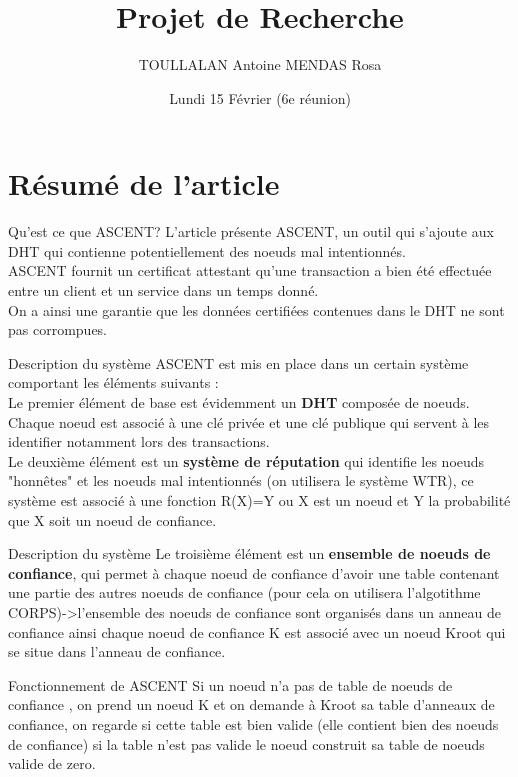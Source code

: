 \documentclass[french]{beamer}
\title{Projet de Recherche}
\author[]{TOULLALAN Antoine MENDAS Rosa}
\date{Lundi 15 Février (6e réunion)}
\begin{document}
\begin{frame}
	\titlepage
\end{frame}
\section{Résumé de l'article}
\begin{frame}{Qu'est ce que ASCENT?}
L’article présente ASCENT, un outil qui s’ajoute aux DHT qui contienne potentiellement des noeuds mal intentionnés. \\ASCENT fournit un certificat attestant qu’une transaction a bien été effectuée entre un client et un service dans un temps donné.\\ On a ainsi une garantie que les données certifiées contenues dans le DHT ne sont pas corrompues.\\
\end{frame}
\begin{frame}{Description du système}
ASCENT est mis en place dans un certain système comportant les éléments suivants :\\Le premier élément de base est évidemment un \textbf{DHT} composée de noeuds. Chaque noeud est associé à une clé privée et une clé publique qui servent à les identifier notamment lors des transactions.\\Le deuxième élément est un \textbf{système de réputation} qui identifie les noeuds "honnêtes" et les noeuds mal intentionnés (on utilisera le système WTR), ce système est associé à une fonction R(X)=Y ou X est un noeud et Y la probabilité que X soit un  noeud de confiance.
\end{frame}
\begin{frame}{Description du système}
Le troisième élément est un \textbf{ensemble de noeuds de confiance}, qui permet à chaque noeud de confiance d'avoir une table contenant une partie des autres noeuds de confiance (pour cela on utilisera l'algotithme CORPS)->l'ensemble des noeuds de confiance sont organisés dans un anneau de confiance ainsi chaque noeud de confiance K est associé avec un noeud Kroot qui se situe dans l'anneau de confiance.
\end{frame}
\begin{frame}{Fonctionnement de ASCENT}
Si un noeud n'a pas de table de noeuds de confiance , on prend un noeud K et on demande à Kroot sa table d'anneaux de confiance, on regarde si cette table est bien valide (elle contient bien des noeuds de confiance) si la table n'est pas valide le noeud construit sa table de noeuds valide de zero.\\
\end{frame}
\end{document}
